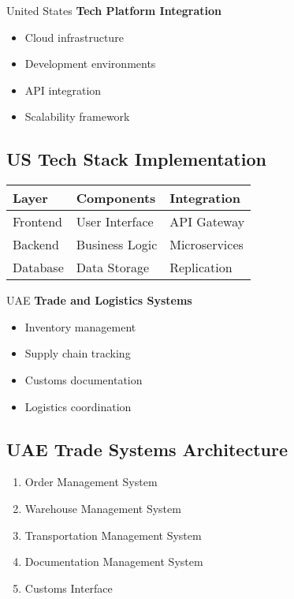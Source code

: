 \begin{regionalbox}{United States}
\textbf{Tech Platform Integration}
\begin{itemize}
    \item Cloud infrastructure
    \item Development environments
    \item API integration
    \item Scalability framework
\end{itemize}
\end{regionalbox}

\subsection{US Tech Stack Implementation}
\begin{center}
\begin{tabularx}{\textwidth}{>{\raggedright\arraybackslash}X >{\raggedright\arraybackslash}X >{\raggedright\arraybackslash}X}
    \toprule
    \textbf{Layer} & \textbf{Components} & \textbf{Integration} \\
    \midrule
    Frontend & User Interface & API Gateway \\
    Backend & Business Logic & Microservices \\
    Database & Data Storage & Replication \\
    \bottomrule
\end{tabularx}
\end{center}

\begin{regionalbox}{UAE}
\textbf{Trade and Logistics Systems}
\begin{itemize}
    \item Inventory management
    \item Supply chain tracking
    \item Customs documentation
    \item Logistics coordination
\end{itemize}

\subsection{UAE Trade Systems Architecture}
\begin{tcolorbox}[colback=white,colframe=primary,title=\textbf{System Components}]
\begin{enumerate}
    \item Order Management System
    \item Warehouse Management System
    \item Transportation Management System
    \item Documentation Management System
    \item Customs Interface
\end{enumerate}
\end{tcolorbox}
\end{regionalbox}

